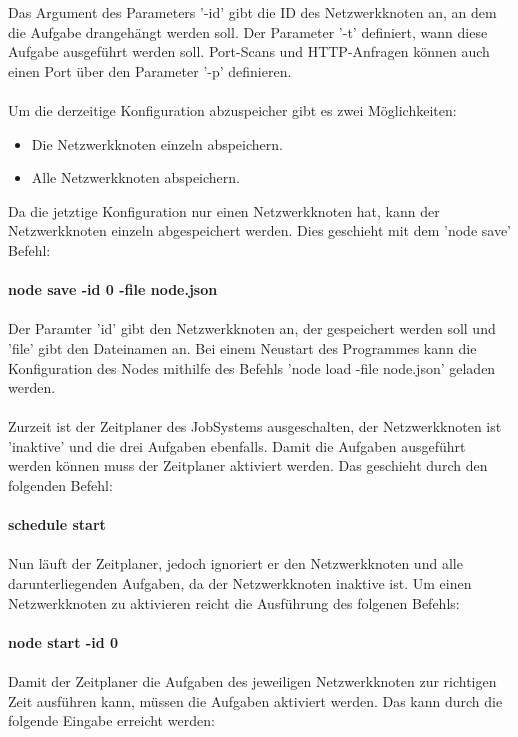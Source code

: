 \documentclass[12pt,a4paper]{report}
\begin{document}
\begin{onehalfspace}
Das Argument des Parameters '-id' gibt die ID des Netzwerkknoten an, an dem die Aufgabe drangehängt werden soll. Der Parameter '-t' definiert, wann diese Aufgabe ausgeführt werden soll. Port-Scans und HTTP-Anfragen können auch einen Port über den Parameter '-p' definieren.\\\\

Um die derzeitige Konfiguration abzuspeicher gibt es zwei Möglichkeiten:

\begin{itemize}
\item Die Netzwerkknoten einzeln abspeichern.
\item Alle Netzwerkknoten abspeichern.
\end{itemize}

Da die jetztige Konfiguration nur einen Netzwerkknoten hat, kann der Netzwerkknoten einzeln abgespeichert werden. Dies geschieht mit dem 'node save' Befehl:\\\\
\textbf{node save -id 0 -file node.json}\\\\
Der Paramter 'id' gibt den Netzwerkknoten an, der gespeichert werden soll und 'file' gibt den Dateinamen an. Bei einem Neustart des Programmes kann die Konfiguration des Nodes mithilfe des Befehls 'node load -file node.json' geladen werden.\\\\
Zurzeit ist der Zeitplaner des JobSystems ausgeschalten, der Netzwerkknoten ist 'inaktive' und die drei Aufgaben ebenfalls. Damit die Aufgaben ausgeführt werden können muss der Zeitplaner aktiviert werden. Das geschieht durch den folgenden Befehl:\\\\
\textbf{schedule start}\\\\
Nun läuft der Zeitplaner, jedoch ignoriert er den Netzwerkknoten und alle darunterliegenden Aufgaben, da der Netzwerkknoten inaktive ist. Um einen Netzwerkknoten zu aktivieren reicht die Ausführung des folgenen Befehls:\\\\
\textbf{node start -id 0}\\\\
Damit der Zeitplaner die Aufgaben des jeweiligen Netzwerkknoten zur richtigen Zeit ausführen kann, müssen die Aufgaben aktiviert werden. Das kann durch die folgende Eingabe erreicht werden:\\\\

\end{onehalfspace}
\end{document}
